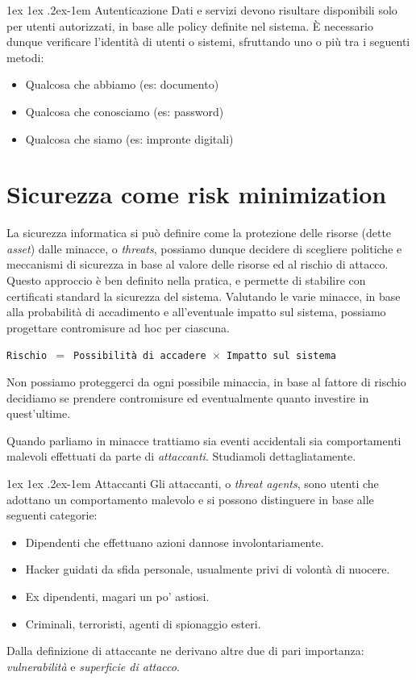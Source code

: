\documentclass[a4paper, 11pt, twoside, openright, fleqn]{report}
\makeatletter
\renewcommand{\paragraph}{%
	\@startsection{paragraph}{4}%
	{\z@}{1ex \@plus 1ex \@minus .2ex}{-1em}%
	{\normalfont\normalsize\bfseries}%
}
\makeatother
\begin{document}
\paragraph{Autenticazione}
Dati e servizi devono risultare disponibili solo per utenti autorizzati, in base alle policy definite nel sistema. \`E necessario dunque verificare l'identità di utenti o sistemi, sfruttando uno o più tra i seguenti metodi:
\begin{itemize}
	\item Qualcosa che abbiamo (es: documento)
	\item Qualcosa che conosciamo (es: password)
	\item Qualcosa che siamo (es: impronte digitali)
\end{itemize}


\section{Sicurezza come risk minimization}
La sicurezza informatica si può definire come la protezione delle risorse (dette \emph{asset}) dalle minacce, o \emph{threats}, possiamo dunque decidere di scegliere politiche e meccanismi di sicurezza in base al valore delle risorse ed al rischio di attacco. Questo approccio è ben definito nella pratica, e permette di stabilire con certificati standard la sicurezza del sistema. Valutando le varie minacce, in base alla probabilità di accadimento e all'eventuale impatto sul sistema, possiamo progettare contromisure ad hoc per ciascuna.
\begin{center}
	\texttt{Rischio $=$ Possibilità di accadere $\times$ Impatto sul sistema}
\end{center}
Non possiamo proteggerci da ogni possibile minaccia, in base al fattore di rischio decidiamo se prendere contromisure ed eventualmente quanto investire in quest'ultime.

Quando parliamo in minacce trattiamo sia eventi accidentali sia comportamenti malevoli effettuati da parte di \emph{attaccanti}. Studiamoli dettagliatamente.

\paragraph{Attaccanti}
Gli attaccanti, o \emph{threat agents}, sono utenti che adottano un comportamento malevolo e si possono distinguere in base alle seguenti categorie:
\begin{itemize}
	\item Dipendenti che effettuano azioni dannose involontariamente.
	\item Hacker guidati da sfida personale, usualmente privi di volontà di nuocere.
	\item Ex dipendenti, magari un po' astiosi.
	\item Criminali, terroristi, agenti di spionaggio esteri.
\end{itemize}
Dalla definizione di attaccante ne derivano altre due di pari importanza: \emph{vulnerabilità} e \emph{superficie di attacco}.
\end{document}
